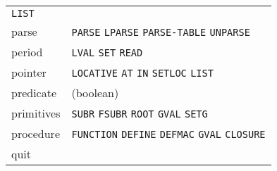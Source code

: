\documentclass[a4paper]{scrbook}
\begin{document}
\begin{longtable}[]{@{}ll@{}}
\begin{minipage}[t]{0.83\columnwidth}
\texttt{LIST}\strut
\end{minipage}\tabularnewline
\begin{minipage}[t]{0.11\columnwidth}\raggedright\strut
parse\strut
\end{minipage} & \begin{minipage}[t]{0.83\columnwidth}\raggedright\strut
\texttt{PARSE} \texttt{LPARSE} \texttt{PARSE-TABLE} \texttt{UNPARSE}\strut
\end{minipage}\tabularnewline
\begin{minipage}[t]{0.11\columnwidth}\raggedright\strut
period\strut
\end{minipage} & \begin{minipage}[t]{0.83\columnwidth}\raggedright\strut
\texttt{LVAL} \texttt{SET} \texttt{READ}\strut
\end{minipage}\tabularnewline
\begin{minipage}[t]{0.11\columnwidth}\raggedright\strut
pointer\strut
\end{minipage} & \begin{minipage}[t]{0.83\columnwidth}\raggedright\strut
\texttt{LOCATIVE} \texttt{AT} \texttt{IN} \texttt{SETLOC} \texttt{LIST}\strut
\end{minipage}\tabularnewline
\begin{minipage}[t]{0.11\columnwidth}\raggedright\strut
predicate\strut
\end{minipage} & \begin{minipage}[t]{0.83\columnwidth}\raggedright\strut
(boolean)\strut
\end{minipage}\tabularnewline
\begin{minipage}[t]{0.11\columnwidth}\raggedright\strut
primitives\strut
\end{minipage} & \begin{minipage}[t]{0.83\columnwidth}\raggedright\strut
\texttt{SUBR} \texttt{FSUBR} \texttt{ROOT} \texttt{GVAL} \texttt{SETG}\strut
\end{minipage}\tabularnewline
\begin{minipage}[t]{0.11\columnwidth}\raggedright\strut
procedure\strut
\end{minipage} & \begin{minipage}[t]{0.83\columnwidth}\raggedright\strut
\texttt{FUNCTION} \texttt{DEFINE} \texttt{DEFMAC} \texttt{GVAL} \texttt{CLOSURE}\strut
\end{minipage}\tabularnewline
\begin{minipage}[t]{0.11\columnwidth}\raggedright\strut
quit\strut
\end{minipage} & \begin{minipage}[t]{0.83\columnwidth}\raggedright\strut

\end{minipage}
\end{longtable}
\end{document}
